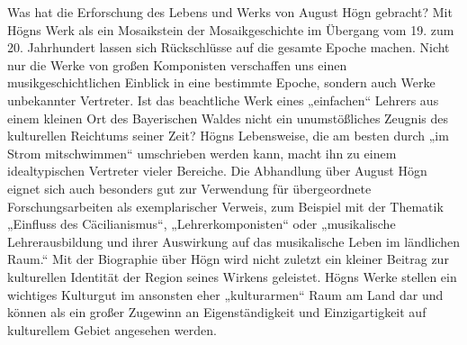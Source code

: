 Was hat die Erforschung des Lebens und Werks von August Högn gebracht?
Mit Högns Werk als ein Mosaikstein der Mosaikgeschichte im Übergang vom
19. zum 20. Jahrhundert lassen sich Rückschlüsse auf die gesamte Epoche
machen. Nicht nur die Werke von großen Komponisten verschaffen uns
einen musikgeschichtlichen Einblick in eine bestimmte Epoche, sondern
auch Werke unbekannter Vertreter. Ist das beachtliche Werk eines
„einfachen“ Lehrers aus einem kleinen Ort des Bayerischen Waldes nicht
ein unumstößliches Zeugnis des kulturellen Reichtums seiner Zeit? Högns
Lebensweise, die am besten durch „im Strom mitschwimmen“ umschrieben
werden kann, macht ihn zu einem idealtypischen Vertreter vieler
Bereiche. Die Abhandlung über August Högn eignet sich auch besonders
gut zur Verwendung für übergeordnete Forschungsarbeiten als
exemplarischer Verweis, zum Beispiel mit der Thematik „Einfluss des
Cäcilianismus“, „Lehrerkomponisten“ oder „musikalische Lehrerausbildung
und ihrer Auswirkung auf das musikalische Leben im ländlichen Raum.“
Mit der Biographie über Högn wird nicht zuletzt ein kleiner Beitrag zur
kulturellen Identität der Region seines Wirkens geleistet. Högns Werke
stellen ein wichtiges Kulturgut im ansonsten eher „kulturarmen“ Raum am
Land dar und können als ein großer Zugewinn an Eigenständigkeit und
Einzigartigkeit auf kulturellem Gebiet angesehen werden.